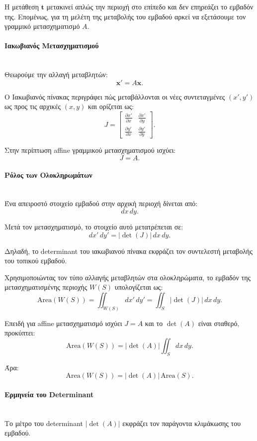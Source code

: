 \documentclass[12pt]{article}
\begin{document}
Η μετάθεση \(\mathbf{t}\) μετακινεί απλώς την περιοχή στο επίπεδο και δεν επηρεάζει το εμβαδόν της. Επομένως, για τη μελέτη της μεταβολής του εμβαδού αρκεί να εξετάσουμε τον γραμμικό μετασχηματισμό \(A\).

\paragraph{Ιακωβιανός Μετασχηματισμού}
\mbox{}\\
Θεωρούμε την αλλαγή μεταβλητών:
\[
\mathbf{x}' = A\mathbf{x}.
\]

Ο Ιακωβιανός πίνακας περιγράφει πώς μεταβάλλονται οι νέες συντεταγμένες \((x',y')\) ως προς τις αρχικές \((x,y)\) και ορίζεται ως:
\[
J =
\begin{bmatrix}
\frac{\partial x'}{\partial x} & \frac{\partial x'}{\partial y} \\
\frac{\partial y'}{\partial x} & \frac{\partial y'}{\partial y}
\end{bmatrix}.
\]

Στην περίπτωση affine γραμμικού μετασχηματισμού ισχύει:
\[
J = A.
\]

\paragraph{Ρόλος των Ολοκληρωμάτων}
\mbox{}\\
Ένα απειροστό στοιχείο εμβαδού στην αρχική περιοχή δίνεται από:
\[
dx\,dy.
\]

Μετά τον μετασχηματισμό, το στοιχείο αυτό μετατρέπεται σε:
\[
dx'\,dy' = \left| \det(J) \right| \, dx\,dy.
\]

Δηλαδή, το determinant του ιακωβιανού πίνακα εκφράζει τον συντελεστή μεταβολής του τοπικού εμβαδού.

Χρησιμοποιώντας τον τύπο αλλαγής μεταβλητών στα ολοκληρώματα, το εμβαδόν της μετασχηματισμένης περιοχής \(W(S)\) υπολογίζεται ως:
\[
\text{Area}(W(S)) = \iint_{W(S)} dx'\,dy'
= \iint_{S} \left| \det(J) \right| \, dx\,dy.
\]

Επειδή για affine μετασχηματισμό ισχύει \(J = A\) και το \(\det(A)\) είναι σταθερό, προκύπτει:
\[
\text{Area}(W(S)) = \left| \det(A) \right| \iint_{S} dx\,dy.
\]

Άρα:
\[
\text{Area}(W(S)) = \left| \det(A) \right| \, \text{Area}(S).
\]

\paragraph{Ερμηνεία του Determinant}
\mbox{}\\
Το μέτρο του determinant \(\left| \det(A) \right|\) εκφράζει τον παράγοντα κλιμάκωσης του εμβαδού.
\end{document}
